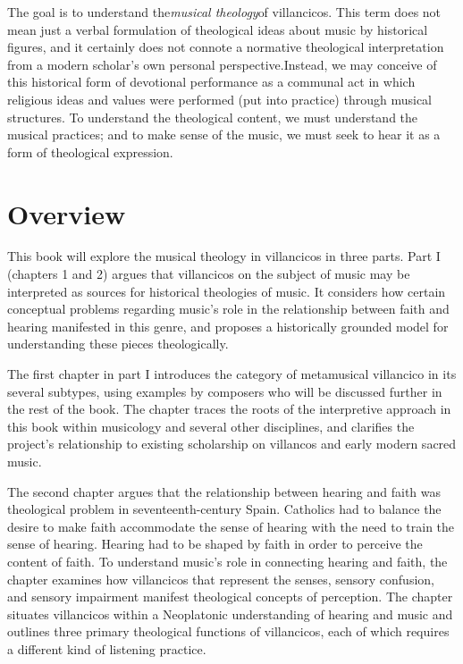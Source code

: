 \documentclass{memoir}
\begin{document}
The goal is to understand the\emph{musical theology}of villancicos. This term does not mean just a verbal formulation of theological ideas about music by historical figures, and it certainly does not connote a normative theological interpretation from a modern scholar’s own personal perspective.Instead, we may conceive of this historical form of devotional performance as a communal act in which religious ideas and values were performed (put into practice) through musical structures. To understand the theological content, we must understand the musical practices; and to make sense of the music, we must seek to hear it as a form of theological expression.

\section{Overview}
    
\label{ch1:overview}

This book will explore the musical theology in villancicos in three parts. Part I (chapters 1 and 2) argues that villancicos on the subject of music may be interpreted as sources for historical theologies of music. It considers how certain conceptual problems regarding music’s role in the relationship between faith and hearing manifested in this genre, and proposes a historically grounded model for understanding these pieces theologically.

The first chapter in part I introduces the category of metamusical villancico in its several subtypes, using examples by composers who will be discussed further in the rest of the book. The chapter traces the roots of the interpretive approach in this book within musicology and several other disciplines, and clarifies the project’s relationship to existing scholarship on villancos and early modern sacred music.

The second chapter argues that the relationship between hearing and faith was theological problem in seventeenth-century Spain. Catholics had to balance the desire to make faith accommodate the sense of hearing with the need to train the sense of hearing. Hearing had to be shaped by faith in order to perceive the content of faith. To understand music’s role in connecting hearing and faith, the chapter examines how villancicos that represent the senses, sensory confusion, and sensory impairment manifest theological concepts of perception. The chapter situates villancicos within a Neoplatonic understanding of hearing and music and outlines three primary theological functions of villancicos, each of which requires a different kind of listening practice.
\end{document}
